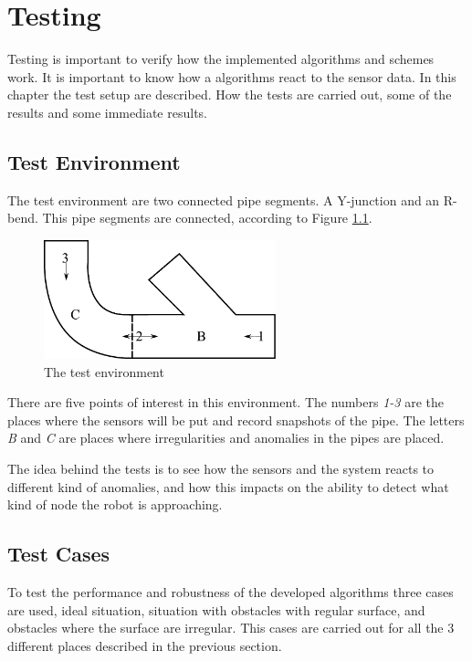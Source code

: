 \chapter{Testing}
\label{chap7}
Testing is important to verify how the implemented algorithms and schemes work. It is
important to know how a algorithms react to the sensor data. 
In this chapter the test setup are described. How the tests are carried out, 
some of the results and some immediate results. 


\section{Test Environment}
The test environment are two connected pipe segments. A Y-junction and an R-bend. This
pipe segments are connected, according to Figure \ref{chap7:fig-environment}.
\begin{figure}[htbp]
    \centering
    \includegraphics[width=0.6\textwidth]{pics/test-environment}
    \caption{The test environment}
    \label{chap7:fig-environment}
\end{figure}
There are five points of interest in this environment. 
The numbers \emph{1-3} are the places where the sensors will be put and record snapshots of the pipe. 
The letters \emph{B} and \emph{C} are places where irregularities and anomalies in the pipes are placed. 

The idea behind the tests is to see how the sensors and the system reacts to different
kind of anomalies, and how this impacts on the ability to detect what kind of node the
robot is approaching. 


\section{Test Cases}
To test the performance and robustness of the developed algorithms three cases are used,
ideal situation, situation with obstacles with regular surface, and obstacles where the
surface are irregular. This cases are carried out for all the 3 different places described
in the previous section.


